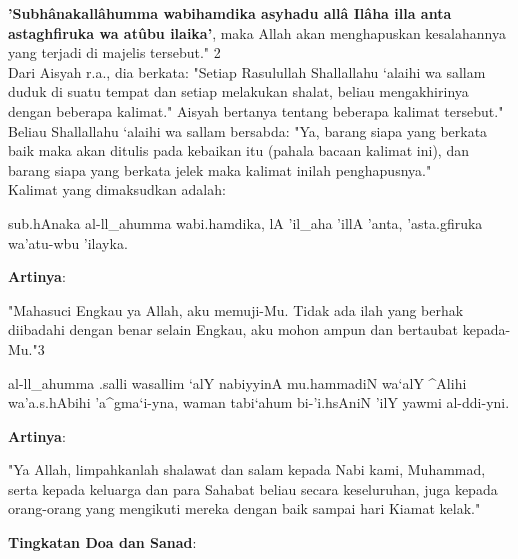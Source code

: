 \documentclass[a4paper,12pt]{article}
\begin{document}
\textbf{'Subh\^{a}nakall\^{a}humma wabihamdika asyhadu all\^{a} 
Il\^{a}ha illa anta astaghfiruka wa at\^{u}bu ilaika'}, maka Allah 
akan menghapuskan kesalahannya yang terjadi di majelis tersebut." 
{\scriptsize 2}\\
\indent
Dari Aisyah r.a., dia berkata: "Setiap Rasulullah Shallallahu ‘alaihi wa 
sallam duduk di suatu tempat dan setiap melakukan shalat, beliau 
mengakhirinya dengan beberapa kalimat." Aisyah bertanya tentang beberapa 
kalimat tersebut." Beliau Shallallahu ‘alaihi wa sallam bersabda: "Ya, 
barang siapa yang berkata baik maka akan ditulis pada kebaikan itu (pahala 
bacaan kalimat ini), dan barang siapa yang berkata jelek maka kalimat 
inilah penghapusnya."\\
\indent
Kalimat yang dimaksudkan adalah: \\
\begin{arabtext}
\noindent
sub.hAnaka al-ll_ahumma wabi.hamdika, lA 'il_aha 'illA 'anta, 'asta.gfiruka
wa'atu-wbu 'ilayka.\\
\end{arabtext}
\noindent
\textbf{Artinya}:
\par
\indent
"Mahasuci Engkau ya Allah, aku memuji-Mu. Tidak ada ilah yang berhak 
diibadahi dengan benar selain Engkau, aku mohon ampun dan bertaubat 
kepada-Mu."{\scriptsize 3}\\
\begin{arabtext}
\noindent
al-ll_ahumma .salli wasallim `alY nabiyyinA mu.hammadiN wa`alY ^Alihi 
wa'a.s.hAbihi 'a^gma`i-yna, waman tabi`ahum bi-'i.hsAniN 'ilY yawmi 
al-ddi-yni.\\
\end{arabtext}
\noindent
\textbf{Artinya}:
\par
\indent
"Ya Allah, limpahkanlah shalawat dan salam kepada Nabi kami, Muhammad, 
serta kepada keluarga dan para Sahabat beliau secara keseluruhan, juga 
kepada orang-orang yang mengikuti mereka dengan baik sampai hari Kiamat 
kelak."\\
\par
\noindent
\textbf{Tingkatan Doa dan Sanad}:
\end{document}
